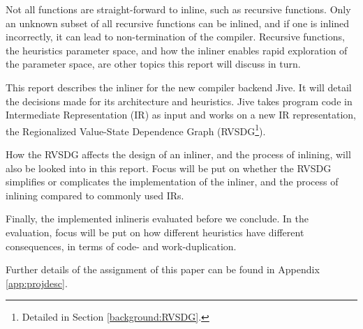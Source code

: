 Not all functions are straight-forward to inline, such as recursive functions.
Only an unknown subset of all recursive functions can be inlined, and if one is
inlined incorrectly, it can lead to non-termination of the compiler. Recursive
functions, the heuristics parameter space, and how the inliner enables rapid
exploration of the parameter space, are other topics this report will discuss in
turn.

This report describes the inliner for the new compiler backend Jive. It will
detail the decisions made for its architecture and heuristics. Jive takes
program code in Intermediate Representation (IR) as input and works on a new IR
representation, the Regionalized Value-State Dependence Graph
(RVSDG\footnote{Detailed in Section \ref{background:RVSDG}.}).


How the RVSDG affects the design of an inliner, and the process of inlining,
will also be looked into in this report. Focus will be put on whether the RVSDG
simplifies or complicates the implementation of the inliner, and the process of
inlining compared to commonly used IRs.

Finally, the implemented inlineris evaluated before we conclude. In the
evaluation, focus will be put on how different heuristics have different
consequences, in terms of code- and work-duplication.

Further details of the assignment of this paper can be found in Appendix
\ref{app:projdesc}.
